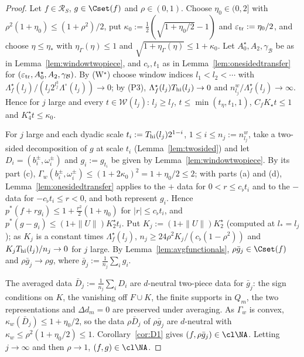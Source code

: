 \begin{proof}
Let $f\in\mathcal R_S$, $g\in\Cset(f)$ and $\rho\in(0,1)$.  Choose
$\eta_0\in(0,2]$ with $\rho^2(1+\eta_0)\le(1+\rho^2)/2$, put
$\kappa_0:=\frac12(\sqrt{1+\eta_0/2}-1)$ and $\varepsilon_{\rm tr}:=
\eta_0/2$, and choose $\eta\le\eta_*$ with $\eta_\Gamma(\eta)\le1$ and
$\sqrt{1+\eta_\Gamma(\eta)}\le1+\kappa_0$.  Let $A^\star_0,A_2,
\gamma_{\mathcal B}$ be as in Lemma~\ref{lem:windowtwopiece}, and
$c_\flat,t_1$ as in Lemma~\ref{lem:onesidedtransfer} for
$(\varepsilon_{\rm tr},A^\star_0,A_2,\gamma_{\mathcal B})$.  By (W$^\star$)
choose window indices $l_1<l_2<\cdots$ with
$\Lambda^\star_f(l_j)/(l_j2^{l_j^3}\Lambda^\circ(l_j))\to0$; by (P3),
$\Lambda^\star_f(l_j)T_{\rm hi}(l_j)\to0$ and $n^w_{l_j}/\Lambda^\star_f
(l_j)\to\infty$.  Hence for $j$ large and every $t\in\mathcal W(l_j)$:
$l_j\ge l_f$, $t\le\min(t_\eta,t_1,1)$, $C_fK_\star t\le1$ and
$K^\star_4t\le\kappa_0$.

For $j$ large and each dyadic scale $t_i:=T_{\rm hi}(l_j)2^{1-i}$, $1\le
i\le n_j:=n^w_{l_j}$, take a two-sided decomposition of $g$ at scale $t_i$
(Lemma~\ref{lem:twosided}) and let $D_i=(b^\pm_i,\omega^\pm_i)$ and
$g_i:=g_{t_i}$ be given by Lemma~\ref{lem:windowtwopiece}.  By its part (c),
$\Gamma_w(b^\pm_i,\omega^\pm_i)\le(1+2\kappa_0)^2=1+\eta_0/2\le2$; with parts
(a) and (d), Lemma~\ref{lem:onesidedtransfer} applies to the $+$ data for
$0<r\le c_\flat t_i$ and to the $-$ data for $-c_\flat t_i\le r<0$, and both
represent $g_i$.  Hence $p^*(f+rg_i)\le1+\frac{r^2}2(1+\eta_0)$ for
$|r|\le c_\flat t_i$, and $p^*(g-g_i)\le(1+\|U\|)K^\star_2t_i$.  Put
$K_j:=(1+\|U\|)K^\star_2$ (computed at $l_*=l_j$); as $K_j$ is a constant
times $\Lambda^\star_f(l_j)$, $n_j\ge24\rho^2K_j/(c_\flat(1-\rho^2))$ and
$K_jT_{\rm hi}(l_j)/n_j\to0$ for $j$ large.  By
Lemma~\ref{lem:avgfunctionals}, $\rho\bar g_j\in\Cset(f)$ and
$\rho\bar g_j\to\rho g$, where $\bar g_j:=\frac1{n_j}\sum_ig_i$.

The averaged data $\bar D_j:=\frac1{n_j}\sum_iD_i$ are $d$-neutral two-piece
data for $\bar g_j$: the sign conditions on $K$, the vanishing off $F\cup
K$, the finite supports in $Q_m$, the two representations and $\Delta d_m=0$
are preserved under averaging.  As $\Gamma_w$ is convex,
$\kappa_w(\bar D_j)\le1+\eta_0/2$, so the data $\rho\bar D_j$ of
$\rho\bar g_j$ are $d$-neutral with $\kappa_w\le\rho^2(1+\eta_0/2)\le1$.
Corollary~\ref{cor:D1} gives $(f,\rho\bar g_j)\in\cl\NA$.  Letting
$j\to\infty$ and then $\rho\to1$, $(f,g)\in\cl\NA$.
\end{proof}

